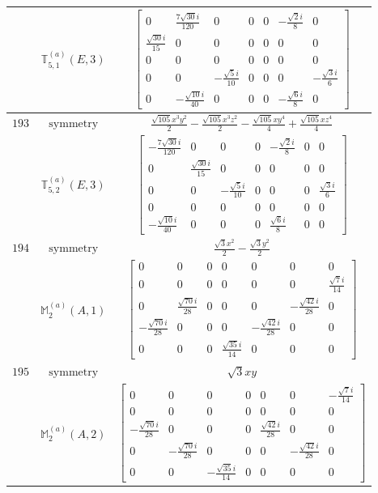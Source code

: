 \documentclass[fleqn,8pt,landscape]{jsarticle}
\begin{document}
\begin{longtable}{ccc}
$  $ & $ \mathbb{T}_{5,1}^{(a)}(E,3) $ & $ \begin{bmatrix} 0 & \frac{7 \sqrt{30} i}{120} & 0 & 0 & 0 & - \frac{\sqrt{2} i}{8} & 0 \\ \frac{\sqrt{30} i}{15} & 0 & 0 & 0 & 0 & 0 & 0 \\ 0 & 0 & 0 & 0 & 0 & 0 & 0 \\ 0 & 0 & - \frac{\sqrt{5} i}{10} & 0 & 0 & 0 & - \frac{\sqrt{3} i}{6} \\ 0 & - \frac{\sqrt{10} i}{40} & 0 & 0 & 0 & - \frac{\sqrt{6} i}{8} & 0 \end{bmatrix} $ \\ \hline
$ 193 $ & $ \text{symmetry} $ & $ \frac{\sqrt{105} x^{3} y^{2}}{2} - \frac{\sqrt{105} x^{3} z^{2}}{2} - \frac{\sqrt{105} x y^{4}}{4} + \frac{\sqrt{105} x z^{4}}{4} $ \\
$  $ & $ \mathbb{T}_{5,2}^{(a)}(E,3) $ & $ \begin{bmatrix} - \frac{7 \sqrt{30} i}{120} & 0 & 0 & 0 & - \frac{\sqrt{2} i}{8} & 0 & 0 \\ 0 & \frac{\sqrt{30} i}{15} & 0 & 0 & 0 & 0 & 0 \\ 0 & 0 & - \frac{\sqrt{5} i}{10} & 0 & 0 & 0 & \frac{\sqrt{3} i}{6} \\ 0 & 0 & 0 & 0 & 0 & 0 & 0 \\ - \frac{\sqrt{10} i}{40} & 0 & 0 & 0 & \frac{\sqrt{6} i}{8} & 0 & 0 \end{bmatrix} $ \\ \hline
$ 194 $ & $ \text{symmetry} $ & $ \frac{\sqrt{3} x^{2}}{2} - \frac{\sqrt{3} y^{2}}{2} $ \\
$  $ & $ \mathbb{M}_{2}^{(a)}(A,1) $ & $ \begin{bmatrix} 0 & 0 & 0 & 0 & 0 & 0 & 0 \\ 0 & 0 & 0 & 0 & 0 & 0 & \frac{\sqrt{7} i}{14} \\ 0 & \frac{\sqrt{70} i}{28} & 0 & 0 & 0 & - \frac{\sqrt{42} i}{28} & 0 \\ - \frac{\sqrt{70} i}{28} & 0 & 0 & 0 & - \frac{\sqrt{42} i}{28} & 0 & 0 \\ 0 & 0 & 0 & \frac{\sqrt{35} i}{14} & 0 & 0 & 0 \end{bmatrix} $ \\ \hline
$ 195 $ & $ \text{symmetry} $ & $ \sqrt{3} x y $ \\
$  $ & $ \mathbb{M}_{2}^{(a)}(A,2) $ & $ \begin{bmatrix} 0 & 0 & 0 & 0 & 0 & 0 & - \frac{\sqrt{7} i}{14} \\ 0 & 0 & 0 & 0 & 0 & 0 & 0 \\ - \frac{\sqrt{70} i}{28} & 0 & 0 & 0 & \frac{\sqrt{42} i}{28} & 0 & 0 \\ 0 & - \frac{\sqrt{70} i}{28} & 0 & 0 & 0 & - \frac{\sqrt{42} i}{28} & 0 \\ 0 & 0 & - \frac{\sqrt{35} i}{14} & 0 & 0 & 0 & 0 \end{bmatrix} $ \\ \hline

\end{longtable}
\end{document}
